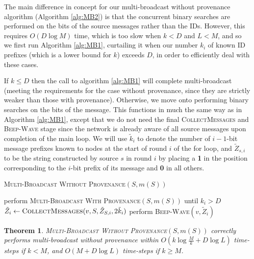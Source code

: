 \documentclass{article}
\newtheorem{theorem}{Theorem}
\begin{document}
The main difference in concept for our multi-broadcast without provenance algorithm (Algorithm \ref{alg:MB2}) is that the concurrent binary searches are performed on the bits of the source messages rather than the IDs. However, this requires $O(D\log M)$ time, which is too slow when $k<D$ and $L<M$, and so we first run Algorithm \ref{alg:MB1}, curtailing it when our number $k_i$ of known ID prefixes (which is a lower bound for $k$) exceeds $D$, in order to efficiently deal with these cases.

If $k \le D$ then the call to algorithm \ref{alg:MB1} will complete multi-broadcast (meeting the requirements for the case without provenance, since they are strictly weaker than those with provenance). Otherwise, we move onto performing binary searches on the bits of the message. This functions in much the same way as in Algorithm \ref{alg:MB1}, except that we do not need the final \textsc{CollectMessages} and \textsc{Beep-Wave} stage since the network is already aware of all source messages upon completion of the main loop. We will use $\tilde{k}_i$ to denote the number of $i-1$-bit message prefixes known to nodes at the start of round $i$ of the for loop, and $\tilde{Z}_{s,i}$ to be the string constructed by source $s$ in round $i$ by placing a \textbf{1} in the position corresponding to the $i$-bit prefix of its message and \textbf{0} in all others.

\begin{algorithm}[h]
	\caption{\textsc{Multi-Broadcast Without Provenance}$(S,m(S))$}
	\label{alg:MB2}
	\begin{algorithmic}
		\State perform \textsc{Multi-Broadcast With Provenance}$(S,m(S))$ until $k_i > D$
		\State $\tilde{Z}_i \gets \textsc{CollectMessages}(v,S,\tilde{Z}_{S,i}, 2\tilde{k}_i)$
		\State perform \textsc{Beep-Wave}$(v,\tilde{Z}_i)$
		\EndFor
		\EndIf
	\end{algorithmic}
\end{algorithm}

\begin{theorem}
	\label{the:MB2}
	\textsc{Multi-Broadcast Without Provenance}$(S,m(S))$ correctly performs multi-broadcast without provenance within $O(k \log \frac{M}{k} + D \log L)$ time-steps if $k<M$, and $O(M + D \log L)$ time-steps if $k \ge M$.
\end{theorem}
\end{document}
